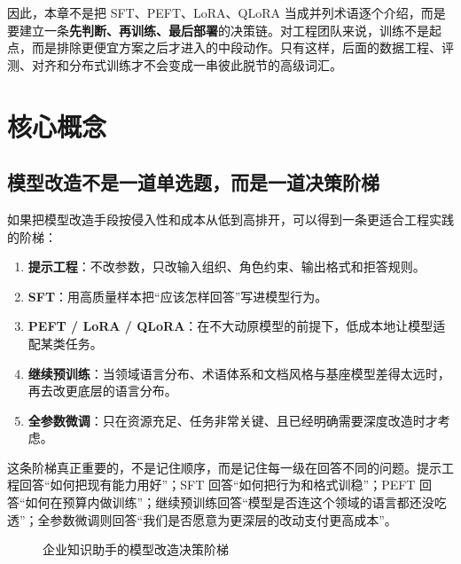 因此，本章不是把 SFT、PEFT、LoRA、QLoRA 当成并列术语逐个介绍，而是要建立一条\textbf{先判断、再训练、最后部署}的决策链。对工程团队来说，训练不是起点，而是排除更便宜方案之后才进入的中段动作。只有这样，后面的数据工程、评测、对齐和分布式训练才不会变成一串彼此脱节的高级词汇。

\section{核心概念}
\subsection{模型改造不是一道单选题，而是一道决策阶梯}
如果把模型改造手段按侵入性和成本从低到高排开，可以得到一条更适合工程实践的阶梯：
\begin{enumerate}
  \item \textbf{提示工程}：不改参数，只改输入组织、角色约束、输出格式和拒答规则。
  \item \textbf{SFT}：用高质量样本把“应该怎样回答”写进模型行为。
  \item \textbf{PEFT / LoRA / QLoRA}：在不大动原模型的前提下，低成本地让模型适配某类任务。
  \item \textbf{继续预训练}：当领域语言分布、术语体系和文档风格与基座模型差得太远时，再去改更底层的语言分布。
  \item \textbf{全参数微调}：只在资源充足、任务非常关键、且已经明确需要深度改造时才考虑。
\end{enumerate}

这条阶梯真正重要的，不是记住顺序，而是记住每一级在回答不同的问题。提示工程回答“如何把现有能力用好”；SFT 回答“如何把行为和格式训稳”；PEFT 回答“如何在预算内做训练”；继续预训练回答“模型是否连这个领域的语言都还没吃透”；全参数微调则回答“我们是否愿意为更深层的改动支付更高成本”。

\begin{figure}[H]
\centering
{}
\caption{企业知识助手的模型改造决策阶梯}
\label{fig:finetune-ladder}
\end{figure}

